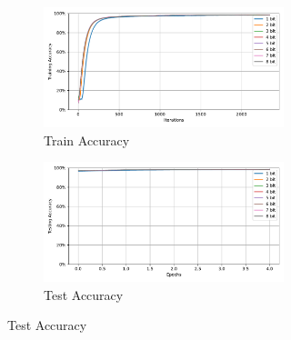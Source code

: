     \label{appendix:accuracy_curves_mnist}
        \begin{figure}[H]
            \centering
            \begin{subfigure}[H]{0.55\textwidth}
                \centering
                \begin{subfigure}[H]{\textwidth}
                    \centering
                    \includegraphics[width=\textwidth]{../standard/MNIST/plots/mnist_train_acc.pdf}
                    \caption{Train Accuracy}
                \end{subfigure}
                \hfill
                \begin{subfigure}[H]{\textwidth}
                    \centering
                    \includegraphics[width=\textwidth]{../standard/MNIST/plots/mnist_test_acc.pdf}
                    \caption{Test Accuracy}
                \end{subfigure}
            \end{subfigure}
            \hfill
            \begin{subfigure}[H]{0.3\textwidth}
                \centering

\end{subfigure}
\end{figure}
